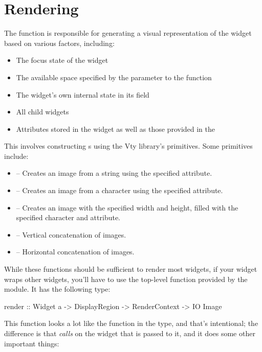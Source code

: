 \section{Rendering}

The  function is responsible for generating a visual
representation of the widget based on various factors, including:

\begin{itemize}
\item The focus state of the widget
\item The available space specified by the  parameter to the
   function
\item The widget's own internal state in its  field
\item All child widgets
\item Attributes stored in the widget as well as those provided in the
\end{itemize}

This involves constructing s using the Vty library's
primitives.  Some primitives include:

\begin{itemize}
\item {} -- Creates an image from a string using the
  specified attribute.
\item {} -- Creates an image from a character using the
  specified attribute.
\item {} -- Creates an image with the specified width and
  height, filled with the specified character and attribute.
\item \fw{<->} -- Vertical concatenation of images.
\item \fw{<|>} -- Horizontal concatenation of images.
\end{itemize}

While these functions should be sufficient to render most widgets, if
your widget wraps other widgets, you'll have to use the top-level
 function provided by the  module.  It has the
following type:

\begin{haskellcode}
 render :: Widget a -> DisplayRegion -> RenderContext -> IO Image
\end{haskellcode}

This function looks a lot like the  function in the
 type, and that's intentional; the difference is that
 \textit{calls}  on the widget that is passed
to it, and it does some other important things:

